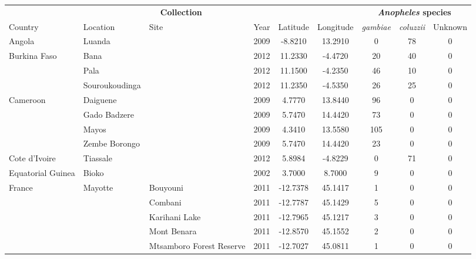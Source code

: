 
\begin{tabular}{lllcccccc}
\toprule
\multicolumn{6}{c}{\textbf{Collection}} &
\multicolumn{3}{c}{\textbf{\emph{Anopheles} species}}\\
\cmidrule(r){1-6}
\cmidrule(r){7-9}
Country & 
Location & 
Site &
Year &
Latitude & 
Longitude & 
\emph{gambiae} & 
\emph{coluzzii} & 
Unknown\\
\midrule

Angola & Luanda &  & 2009 & -8.8210 & 13.2910 & 0 & 78 & 0 \\

Burkina Faso & Bana &  & 2012 & 11.2330 & -4.4720 & 20 & 40 & 0 \\

 & Pala &  & 2012 & 11.1500 & -4.2350 & 46 & 10 & 0 \\

 & Souroukoudinga &  & 2012 & 11.2350 & -4.5350 & 26 & 25 & 0 \\

Cameroon & Daiguene &  & 2009 & 4.7770 & 13.8440 & 96 & 0 & 0 \\

 & Gado Badzere &  & 2009 & 5.7470 & 14.4420 & 73 & 0 & 0 \\

 & Mayos &  & 2009 & 4.3410 & 13.5580 & 105 & 0 & 0 \\

 & Zembe Borongo &  & 2009 & 5.7470 & 14.4420 & 23 & 0 & 0 \\

Cote d'Ivoire & Tiassale &  & 2012 & 5.8984 & -4.8229 & 0 & 71 & 0 \\

Equatorial Guinea & Bioko &  & 2002 & 3.7000 & 8.7000 & 9 & 0 & 0 \\

France & Mayotte & Bouyouni & 2011 & -12.7378 & 45.1417 & 1 & 0 & 0 \\

 &  & Combani & 2011 & -12.7787 & 45.1429 & 5 & 0 & 0 \\

 &  & Karihani Lake & 2011 & -12.7965 & 45.1217 & 3 & 0 & 0 \\

 &  & Mont Benara & 2011 & -12.8570 & 45.1552 & 2 & 0 & 0 \\

 &  & Mtsamboro Forest Reserve & 2011 & -12.7027 & 45.0811 & 1 & 0 & 0 \\


\end{tabular}
